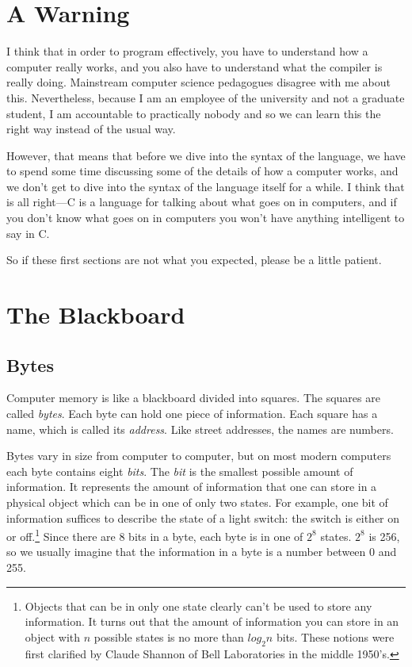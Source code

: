 %
%
%

\section{A Warning}

    I think that in order to program effectively, you have to understand
how a computer really works, and you also have to understand what the
compiler is really doing.  Mainstream computer science pedagogues
disagree with me about this.  Nevertheless, because I am an employee of
the university and not a graduate student, I am accountable to
practically nobody and so we can learn this the right way instead of the
usual way.

    However, that means that before we dive into the syntax of the
language, we have to spend some time discussing some of the details of
how a computer works, and we don't get to dive into the syntax of the
language itself for a while.  I think that is all right---C is a
language for talking about what goes on in computers, and if you don't
know what goes on in computers you won't have anything intelligent to
say in C.

    So if these first sections are not what you expected, please be a
little patient.

\section{The Blackboard}

\subsection{Bytes}

    Computer memory is like a blackboard divided into squares.  The
squares are called {\em bytes}\/. Each byte can hold one piece of
information.  Each square has a name, which is called its {\em
address}\/.  Like street addresses, the names are numbers.

    Bytes vary in size from computer to computer, but on most modern
computers each byte contains eight {\em bits}.  The {\em bit}\/ is the
smallest possible amount of information.  It represents the amount of
information that one can store in a physical object which can be in one
of only two states.  For example, one bit of information suffices to
describe the state of a light switch: the switch is either on or
off.\footnote{Objects that can be in only one state clearly can't be
used to store any information.  It turns out that the amount of
information you can store in an object with $n$ possible states is no
more than $log_2 n$ bits.  These notions were first clarified by Claude
Shannon of Bell Laboratories in the middle 1950's.} Since there are 8
bits in a byte, each byte is in one of $2^8$ states.  $2^8$ is 256, so
we usually imagine that the information in a byte is a number between 0
and 255.


